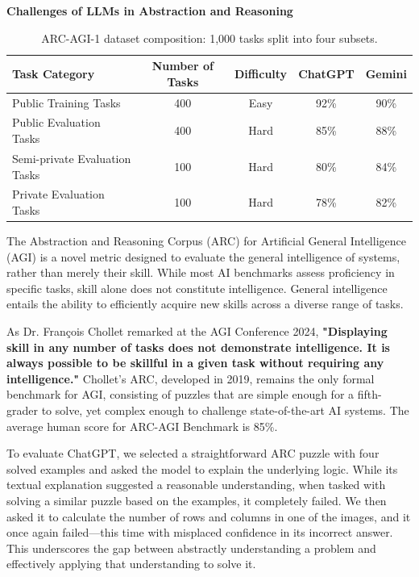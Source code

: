 \documentclass[11pt]{scrartcl}
\begin{document}
\begin{huge}
\textbf{Challenges of LLMs in Abstraction and Reasoning}
\end{huge}

\begin{table}[ht]
\centering
\begin{tabular}{lcccc}
\toprule
Task Category                  & Number of Tasks & Difficulty & ChatGPT & Gemini \\
\midrule
Public Training Tasks          & 400             & Easy   & 92\%  & 90\%    \\
Public Evaluation Tasks        & 400             & Hard   & 85\%   &  88\%   \\
Semi-private Evaluation Tasks  & 100             & Hard   & 80\%  & 84\%    \\
Private Evaluation Tasks       & 100             & Hard   & 78\%  & 82\%    \\
\bottomrule
\end{tabular}
\caption{ARC-AGI-1 dataset composition: 1,000 tasks split into four subsets.}
\label{tab:arcagi1}
\end{table}

The Abstraction and Reasoning Corpus (ARC) for Artificial General Intelligence (AGI) is a novel metric designed to evaluate the general intelligence of systems, rather than merely their skill. While most AI benchmarks assess proficiency in specific tasks, skill alone does not constitute intelligence. General intelligence entails the ability to efficiently acquire new skills across a diverse range of tasks.

As Dr. François Chollet remarked at the AGI Conference 2024\cite{ref9}, \textbf{"Displaying skill in any number of tasks does not demonstrate intelligence. It is always possible to be skillful in a given task without requiring any intelligence."} Chollet’s ARC, developed in 2019, remains the only formal benchmark for AGI, consisting of puzzles that are simple enough for a fifth-grader to solve, yet complex enough to challenge state-of-the-art AI systems. The average human score for ARC-AGI Benchmark is 85\%.

To evaluate ChatGPT, we selected a straightforward ARC puzzle with four solved examples and asked the model to explain the underlying logic. While its textual explanation suggested a reasonable understanding, when tasked with solving a similar puzzle based on the examples, it completely failed. We then asked it to calculate the number of rows and columns in one of the images, and it once again failed—this time with misplaced confidence in its incorrect answer. This underscores the gap between abstractly understanding a problem and effectively applying that understanding to solve it.
\end{document}
